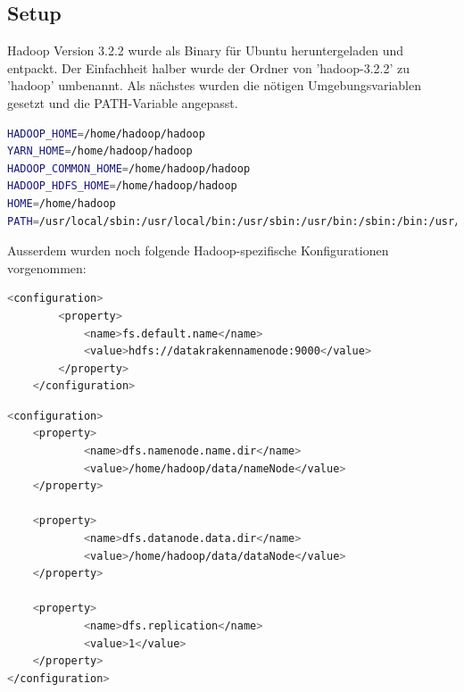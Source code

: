 \documentclass[12pt,oneside,a4paper,parskip]{scrbook}
\begin{document}
\subsection{Setup}
Hadoop Version 3.2.2 wurde als Binary für Ubuntu heruntergeladen und entpackt. Der Einfachheit halber wurde der Ordner von 'hadoop-3.2.2' zu 'hadoop' umbenannt.
Als nächstes wurden die nötigen Umgebungsvariablen gesetzt und die PATH-Variable angepasst.
\begin{lstlisting}[caption=etc/environment,label=env,language=bash]
HADOOP_HOME=/home/hadoop/hadoop
YARN_HOME=/home/hadoop/hadoop
HADOOP_COMMON_HOME=/home/hadoop/hadoop
HADOOP_HDFS_HOME=/home/hadoop/hadoop
HOME=/home/hadoop
PATH=/usr/local/sbin:/usr/local/bin:/usr/sbin:/usr/bin:/sbin:/bin:/usr/games:/usr/local/games:/snap/bin:/bin:/home/hadoop/hadoop/bin:/home/hadoop/hadoop/sbin:/usr/lib/jvm/java-8-openjdk-amd64/bin:/usr/lib/jvm/java-8-openjdk-amd64/sbin
\end{lstlisting}
Ausserdem wurden noch folgende Hadoop-spezifische Konfigurationen vorgenommen: \newline
\begin{lstlisting}[caption=/hadoop/etc/hadoop/core-site.xml,label=coresitexml,language=bash]
<configuration>
        <property>
            <name>fs.default.name</name>
            <value>hdfs://datakrakennamenode:9000</value>
        </property>
    </configuration>
\end{lstlisting}
\begin{lstlisting}[caption=hadoop/etc/hadoop/hdfs-site.xml,label=hdfssitexml,language=bash]
<configuration>
    <property>
            <name>dfs.namenode.name.dir</name>
            <value>/home/hadoop/data/nameNode</value>
    </property>

    <property>
            <name>dfs.datanode.data.dir</name>
            <value>/home/hadoop/data/dataNode</value>
    </property>

    <property>
            <name>dfs.replication</name>
            <value>1</value>
    </property>
</configuration>
\end{lstlisting}
\end{document}

